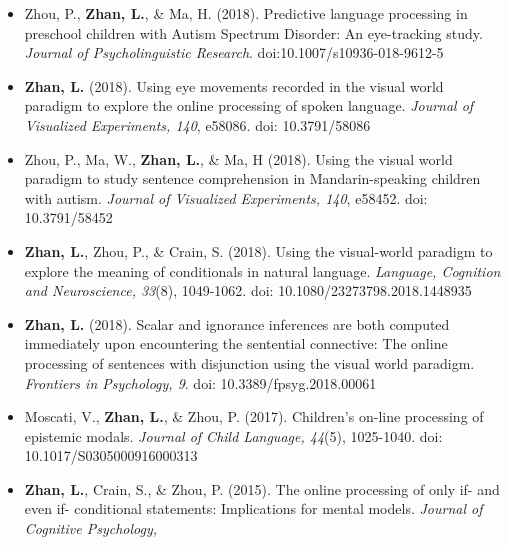\documentclass[12pt,]{article}
\begin{document}
\begin{itemize}
\item
  Zhou, P., \textbf{Zhan, L.}, \& Ma, H. (2018). Predictive language
  processing in preschool children with Autism Spectrum Disorder: An
  eye-tracking study. \emph{Journal of Psycholinguistic Research}.
  doi:10.1007/s10936-018-9612-5
  \href{https://publications.likan.info/Periodicals/JPsycholinguistRes2018.pdf}{
  \faFilePdf[regular] }
\item
  \textbf{Zhan, L.} (2018). Using eye movements recorded in the visual
  world paradigm to explore the online processing of spoken language.
  \emph{Journal of Visualized Experiments, 140}, e58086. doi:
  10.3791/58086
  \href{https://publications.likan.info/Periodicals/jove-protocol-58086.pdf}{
  \faFilePdf[regular] }
\item
  Zhou, P., Ma, W., \textbf{Zhan, L.}, \& Ma, H (2018). Using the visual
  world paradigm to study sentence comprehension in Mandarin-speaking
  children with autism. \emph{Journal of Visualized Experiments, 140},
  e58452. doi: 10.3791/58452
  \href{https://publications.likan.info/Periodicals/jove-protocol-58452.pdf}{
  \faFilePdf[regular] }
\item
  \textbf{Zhan, L.}, Zhou, P., \& Crain, S. (2018). Using the
  visual-world paradigm to explore the meaning of conditionals in
  natural language. \emph{Language, Cognition and Neuroscience, 33}(8),
  1049-1062. doi: 10.1080/23273798.2018.1448935
  \href{https://publications.likan.info/Periodicals/LangCognNeurosci2018.pdf}{
  \faFilePdf[regular] }
\item
  \textbf{Zhan, L.} (2018). Scalar and ignorance inferences are both
  computed immediately upon encountering the sentential connective: The
  online processing of sentences with disjunction using the visual world
  paradigm. \emph{Frontiers in Psychology, 9}. doi:
  10.3389/fpsyg.2018.00061
  \href{https://www.frontiersin.org/articles/10.3389/fpsyg.2018.00061/full}{
  \faFilePdf[regular] }
\item
  Moscati, V., \textbf{Zhan, L.}, \& Zhou, P. (2017). Children's on-line
  processing of epistemic modals. \emph{Journal of Child Language,
  44}(5), 1025-1040. doi: 10.1017/S0305000916000313
  \href{https://publications.likan.info/Periodicals/JChildLang2016.pdf}{
  \faFilePdf[regular] }
\item
  \textbf{Zhan, L.}, Crain, S., \& Zhou, P. (2015). The online
  processing of only if- and even if- conditional statements:
  Implications for mental models. \emph{Journal of Cognitive Psychology,
}
\end{itemize}
\end{document}

